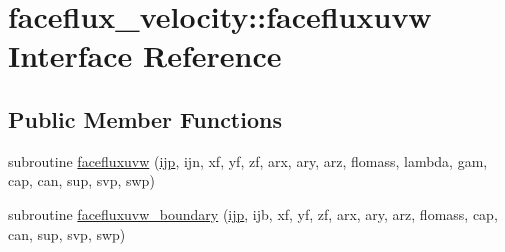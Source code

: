 \hypertarget{interfacefaceflux__velocity_1_1facefluxuvw}{\section{faceflux\-\_\-velocity\-:\-:facefluxuvw Interface Reference}
\label{interfacefaceflux__velocity_1_1facefluxuvw}
}
\subsection*{Public Member Functions}
\begin{DoxyCompactItemize}
\item 
subroutine \hyperlink{interfacefaceflux__velocity_1_1facefluxuvw_ada009356e8199a1f363a431e40068e45}{facefluxuvw} (\hyperlink{CourantNo_8h_accea320a458bb8759c7ece360e05ddf4}{ijp}, ijn, xf, yf, zf, arx, ary, arz, flomass, lambda, gam, cap, can, sup, svp, swp)
\item 
subroutine \hyperlink{interfacefaceflux__velocity_1_1facefluxuvw_abe1dbe2c4c152287906de80992d26fa1}{facefluxuvw\-\_\-boundary} (\hyperlink{CourantNo_8h_accea320a458bb8759c7ece360e05ddf4}{ijp}, ijb, xf, yf, zf, arx, ary, arz, flomass, cap, can, sup, svp, swp)
\end{DoxyCompactItemize}


